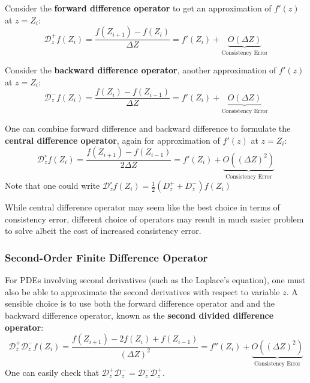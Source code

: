 \documentclass[../dissertation.tex]{subfiles}
\begin{document}
Consider the \textbf{forward difference operator} to get an approximation of $f'(z)$ at $z = Z_i$:
\begin{equation}
    \mathcal{D}_z^+ f \left( Z_i \right) = \frac{f \left( Z_{i+1} \right) - f\left( Z_i \right)}{\Delta Z} = f'\left( Z_i \right) + \underbrace{O \left( \Delta Z \right)}_{\text{Consistency Error}}
\end{equation}

Consider the \textbf{backward difference operator}, another approximation of $f'(z)$ at $z = Z_i$:
\begin{equation}
    \mathcal{D}_z^- f \left( Z_i \right) = \frac{f \left( Z_i \right) - f\left( Z_{i-1} \right)}{\Delta Z} = f'\left( Z_i \right) + \underbrace{O \left( \Delta Z \right)}_{\text{Consistency Error}}
\end{equation}

One can combine forward difference and backward difference to formulate the \textbf{central difference operator}, again for approximation of $f'(z)$ at $z = Z_i$:
\begin{equation}
    \mathcal{D}_z^\circ f \left( Z_i \right) = \frac{f \left( Z_{i+1} \right) - f\left( Z_{i-1} \right)}{2 \Delta Z} = f'\left( Z_i \right) + \underbrace{O \left( \left( \Delta Z \right)^2 \right)}_{\text{Consistency Error}}
\end{equation}
Note that one could write $\mathcal{D}_z^\circ f \left( Z_i \right) = \frac{1}{2}\left( D_z^+ + D_z^- \right) f \left( Z_i \right) $

While central difference operator may seem like the best choice in terms of consistency error,
different choice of operators may result in much easier problem to solve albeit the cost of increased consistency error.

\subsubsection{Second-Order Finite Difference Operator}
For PDEs involving second derivatives (such as the Laplace's equation), one must also be able to approximate the second derivatives with respect to variable $z$.
A sensible choice is to use both the forward difference operator and and the backward difference operator, known as the \textbf{second divided difference operator}:
\begin{equation}
    \mathcal{D}_z^+ \mathcal{D}_z^- f \left( Z_i \right) = \frac{f \left( Z_{i+1} \right) - 2 f \left( Z_i \right) + f \left( Z_{i-1} \right)}{\left( \Delta Z \right)^2} = f''\left( Z_i \right) + \underbrace{O \left( \left( \Delta Z \right)^2 \right)}_{\text{Consistency Error}}
\end{equation}
One can easily check that $\mathcal{D}_z^+ \mathcal{D}_z^- = \mathcal{D}_z^- \mathcal{D}_z^+$.
\end{document}
